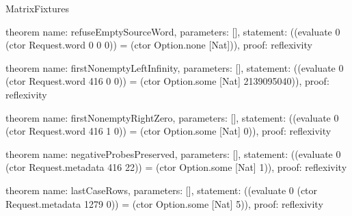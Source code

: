 \begin{lexlean}{MatrixFixtures}
\begin{semanticmodule}
theorem{
  name: refuseEmptySourceWord,
  parameters: [],
  statement: ((evaluate 0 (ctor Request.word 0 0 0)) = (ctor Option.none [Nat])),
  proof: reflexivity{}
}

theorem{
  name: firstNonemptyLeftInfinity,
  parameters: [],
  statement: ((evaluate 0 (ctor Request.word 416 0 0)) = (ctor Option.some [Nat] 2139095040)),
  proof: reflexivity{}
}

theorem{
  name: firstNonemptyRightZero,
  parameters: [],
  statement: ((evaluate 0 (ctor Request.word 416 1 0)) = (ctor Option.some [Nat] 0)),
  proof: reflexivity{}
}

theorem{
  name: negativeProbesPreserved,
  parameters: [],
  statement: ((evaluate 0 (ctor Request.metadata 416 22)) = (ctor Option.some [Nat] 1)),
  proof: reflexivity{}
}

theorem{
  name: lastCaseRows,
  parameters: [],
  statement: ((evaluate 0 (ctor Request.metadata 1279 0)) = (ctor Option.some [Nat] 5)),
  proof: reflexivity{}
}
\end{semanticmodule}
\end{lexlean}
